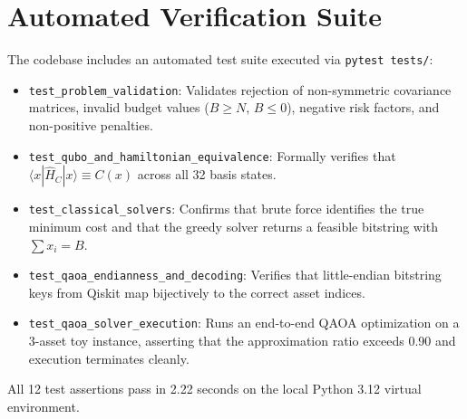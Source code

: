 \section{Automated Verification Suite}
The codebase includes an automated test suite executed via \texttt{pytest tests/}:
\begin{itemize}
    \item \texttt{test\_problem\_validation}: Validates rejection of non-symmetric covariance matrices, invalid budget values ($B \ge N$, $B \le 0$), negative risk factors, and non-positive penalties.
    \item \texttt{test\_qubo\_and\_hamiltonian\_equivalence}: Formally verifies that $\langle x | \hat{H}_C | x \rangle \equiv C(x)$ across all 32 basis states.
    \item \texttt{test\_classical\_solvers}: Confirms that brute force identifies the true minimum cost and that the greedy solver returns a feasible bitstring with $\sum x_i = B$.
    \item \texttt{test\_qaoa\_endianness\_and\_decoding}: Verifies that little-endian bitstring keys from Qiskit map bijectively to the correct asset indices.
    \item \texttt{test\_qaoa\_solver\_execution}: Runs an end-to-end QAOA optimization on a 3-asset toy instance, asserting that the approximation ratio exceeds 0.90 and execution terminates cleanly.
\end{itemize}
All 12 test assertions pass in 2.22 seconds on the local Python 3.12 virtual environment.
